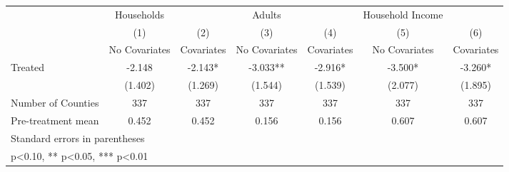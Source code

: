 {
\def\sym#1{\ifmmode^{#1}\else\(^{#1}\)\fi}
\begin{tabular}{l*{6}{c}}
\hline\hline
            &  Households   &               &      Adults   &               &Household Income   &               \\
            &\multicolumn{1}{c}{(1)}&\multicolumn{1}{c}{(2)}&\multicolumn{1}{c}{(3)}&\multicolumn{1}{c}{(4)}&\multicolumn{1}{c}{(5)}&\multicolumn{1}{c}{(6)}\\
            &\multicolumn{1}{c}{No Covariates}&\multicolumn{1}{c}{Covariates}&\multicolumn{1}{c}{No Covariates}&\multicolumn{1}{c}{Covariates}&\multicolumn{1}{c}{No Covariates}&\multicolumn{1}{c}{Covariates}\\
\hline
Treated     &      -2.148   &      -2.143*  &      -3.033** &      -2.916*  &      -3.500*  &      -3.260*  \\
            &     (1.402)   &     (1.269)   &     (1.544)   &     (1.539)   &     (2.077)   &     (1.895)   \\
\hline
Number of Counties&         337   &         337   &         337   &         337   &         337   &         337   \\
Pre-treatment mean&       0.452   &       0.452   &       0.156   &       0.156   &       0.607   &       0.607   \\
\hline\hline
\multicolumn{7}{l}{\footnotesize Standard errors in parentheses}\\
\multicolumn{7}{l}{\footnotesize * p<0.10, ** p<0.05, *** p<0.01}\\
\end{tabular}
}
